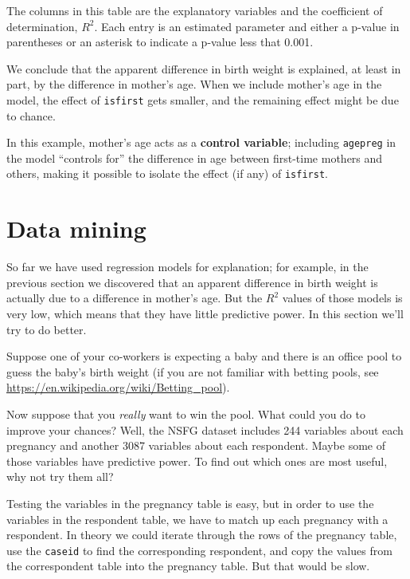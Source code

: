 The columns in this table are the explanatory variables and
the coefficient of determination, $R^2$.  Each entry is an estimated
parameter and either a p-value in parentheses or an asterisk to
indicate a p-value less that 0.001.

We conclude that the apparent difference in birth weight
is explained, at least in part, by the difference in mother's age.
When we include mother's age in the model, the effect of
{\tt isfirst} gets smaller, and the remaining effect might be
due to chance.

In this example, mother's age acts as a {\bf control variable};
including {\tt agepreg} in the model ``controls for'' the
difference in age between first-time mothers and others, making
it possible to isolate the effect (if any) of {\tt isfirst}. 


\section{Data mining}
\label{mining}

So far we have used regression models for explanation; for example,
in the previous section we discovered that an apparent difference
in birth weight is actually due to a difference in mother's age.
But the $R^2$ values of those models is very low, which means that
they have little predictive power.  In this section we'll try to
do better.

Suppose one of your co-workers is expecting a baby and
there is an office pool to guess the baby's birth weight (if you are
not familiar with betting pools, see
\url{https://en.wikipedia.org/wiki/Betting_pool}).

Now suppose that you {\em really} want to win the pool.  What could
you do to improve your chances?  Well, 
the NSFG dataset includes 244 variables about each pregnancy and another
3087 variables about each respondent.  Maybe some of those variables
have predictive power.  To find out which ones are most useful,
why not try them all?

Testing the variables in the pregnancy table is easy, but in order to
use the variables in the respondent table, we have to match up each
pregnancy with a respondent.  In theory we could iterate through the
rows of the pregnancy table, use the {\tt caseid} to find the
corresponding respondent, and copy the values from the
correspondent table into the pregnancy table.  But that would be slow.

